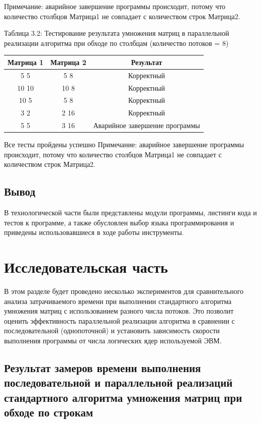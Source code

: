 \documentclass[12pt]{report}
\begin{document}
Примечание: аварийное завершение программы происходит, потому что количество столбцов Матрица1 не совпадает с количеством строк Матрица2.

\begin{center}
	\centering
	\caption{Таблица 3.2: Тестирование результата умножения матриц в параллельной реализации алгоритма при обходе по столбцам (количество потоков = 8)}
	\begin{tabular}{|c c c|}
		\hline
		Матрица 1 & Матрица 2 &  Результат \\ [0.5ex] 
 		\hline\hline
		5 5 & 5 8 & Корректный\\
 		\hline
 		10 10 & 10 8 & Корректный\\
		\hline
		10 5 & 5 8 & Корректный\\
 		\hline
 		 3 2 & 2 16 & Корректный\\
 		\hline
		5 5 & 3 16 & Аварийное завершение программы\\
		\hline
	\end{tabular}
\end{center} 
Все тесты пройдены успешно \newline
Примечание: аварийное завершение программы происходит, потому что количество столбцов Матрица1 не совпадает с количеством строк Матрица2.


\section{Вывод}
В технологической части были представлены модули программы, листинги кода и тестов к программе, а также обусловлен выбор языка программирования и приведены использовавшиеся в ходе работы инструменты.

\chapter{Исследовательская часть}

В этом разделе будет проведено несколько экспериментов для сравнительного анализа затрачиваемого времени при выполнении стандартного алгоритма умножения матриц с использованием разного числа потоков. Это позволит оценить эффективность параллельной реализации алгоритма в сравнении с последовательной (однопоточной) и установить зависимость скорости выполнения программы от числа логических ядер используемой ЭВМ.


\section{Результат замеров времени выполнения последовательной и параллельной реализаций стандартного алгоритма умножения матриц при обходе по строкам} 
\end{document}
